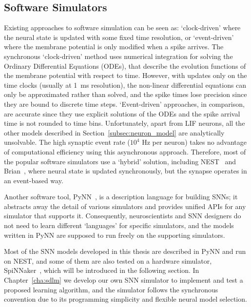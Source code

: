 \subsection{Software Simulators}
Existing approaches to software simulation can be seen as: `clock-driven' where the neural state is updated with some fixed time resolution, or `event-driven' where the membrane potential is only modified when a spike arrives.
The synchronous `clock-driven' method uses numerical integration for solving the Ordinary Differential Equations (ODEs), that describe the evolution functions of the membrane potential with respect to time.
However, with updates only on the time clocks (usually at 1~ms resolution), the non-linear differential equations can only be approximated rather than solved, and the spike times lose precision since they are bound to discrete time steps.
`Event-driven' approaches, in comparison, are accurate since they use explicit solutions of the ODEs and the spike arrival time is not rounded to time bins.
Unfortunately, apart from LIF neurons, all the other models described in Section~\ref{subsec:neuron_model} are analytically unsolvable.
The high synaptic event rate ($10^4$ Hz per neuron) takes no advantage of computational efficiency using this asynchronous approach.
Therefore, most of the popular software simulators use a `hybrid' solution, including NEST~\citep{gewaltig2007nest} and Brian~\citep{goodman2008brian}, where 
neural state is updated synchronously, but the synapse operates in an event-based way.

Another software tool, PyNN~\citep{davison2008pynn}, is a description language for building SNNs;
it abstracts away the detail of various simulators and provides unified APIs for any simulator that supports it.
Consequently, neuroscientists and SNN designers do not need to learn different `languages' for specific simulators, and the models written in PyNN are supposed to run freely on the supporting simulators.

Most of the SNN models developed in this thesis are described in PyNN and run on NEST, and some of them are also tested on a hardware simulator, SpiNNaker~\citep{furber2014spinnaker}, which will be introduced in the following section.
In Chapter~\ref{cha:sdlm} we develop our own SNN simulator to implement and test a proposed learning algorithm, and the simulator follows the synchronous convention due to its programming simplicity and flexible neural model selection. 


